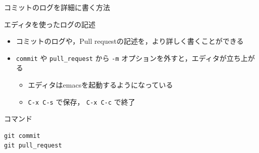 \documentclass[t, aspectratio=169]{beamer}
\begin{document}
\begin{frame}[fragile,label=sec-2-3-7]{コミットのログを詳細に書く方法}
 \begin{block}{エディタを使ったログの記述}
\begin{itemize}
\item コミットのログや，Pull requestの記述を，より詳しく書くことができる
\item \texttt{commit} や \texttt{pull\_request} から  \texttt{-m} オプションを外すと，エディタが立ち上がる
\begin{itemize}
\item エディタはemacsを起動するようになっている
\item \texttt{C-x C-s} で保存， \texttt{C-x C-c} で終了
\end{itemize}
\end{itemize}
\end{block}
\begin{block}{コマンド}
\begin{verbatim}
git commit
git pull_request
\end{verbatim}
\end{block}
\end{frame}
\end{document}
